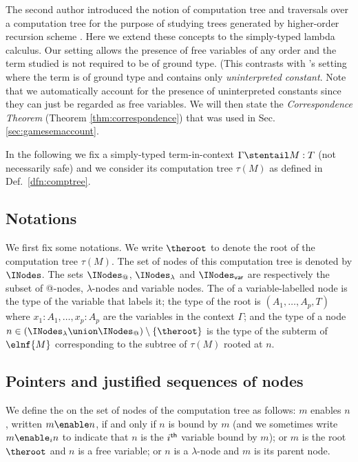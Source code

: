 The second author introduced the notion of
computation tree and traversals over a computation tree for the
purpose of studying trees generated by higher-order recursion
scheme \cite{OngLics2006}. Here we extend these concepts to the simply-typed lambda
calculus. Our setting allows the presence of free variables of any
order and the term studied is not required to be of ground type.
(This contrasts with \cite{OngLics2006}'s setting where the term is
of ground type and contains only \emph{uninterpreted
constant}.
Note that we automatically account for the
presence of uninterpreted constants since they can just be regarded
as free variables. We will then state the \emph{Correspondence
Theorem} (Theorem \ref{thm:correspondence}) that was used in Sec.
\ref{sec:gamesemaccount}.

In the following we fix a simply-typed term-in-context $\Gamma \stentail M :T$
(not necessarily safe) and we consider its computation tree
$\tau(M)$ as defined in Def.\ \ref{dfn:comptree}.

\subsection{Notations}
We first fix some notations. We write $\theroot$ to denote the root
of the computation tree $\tau(M)$. The set of nodes of this
computation tree is denoted by $\INodes$. The sets $\INodes_@$, $\INodes_\lambda$ and
$\INodes_{\sf var}$ are respectively the subset of @-nodes,
$\lambda$-nodes and variable nodes. The  of a variable-labelled node is the
type of the variable that labels it; the type of the root is
$(A_1,\ldots,A_p, T)$ where $x_1:A_1,\ldots, x_p:A_p$ are the
variables in the context $\Gamma$; and the type of a node $n\in
(\INodes_\lambda \union \INodes_@) \setminus \{ \theroot \}$ is the type of the
subterm of $\elnf{M}$ corresponding to the subtree of $\tau(M)$ rooted at $n$.


\subsection{Pointers and justified sequences of nodes}

We define the  on the set of nodes of the
computation tree as follows: $m$ enables $n$, written $m \enable n$,
if and only if $n$ is bound by $m$ (and we sometimes write $m
\enable_i n$ to indicate that $n$ is the $i^{\sf th}$ variable bound
by $m$); or $m$ is the root $\theroot$ and $n$ is a free variable;
or $n$ is a $\lambda$-node and $m$ is its parent node.


